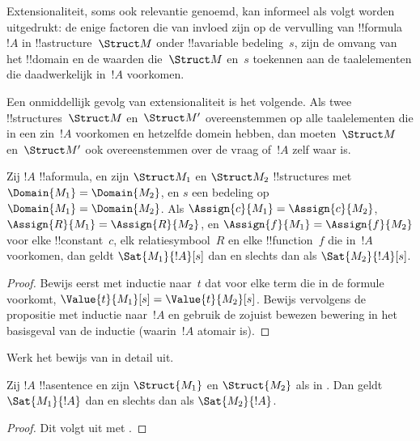 \documentclass[openany]{memoir}
\begin{document}
\begin{explain}
Extensionaliteit, soms ook relevantie genoemd, kan informeel als
volgt worden uitgedrukt: de enige factoren die van invloed zijn op de
vervulling van !!{formula}~$!A$ in !!a{structure}~$\Struct M$ onder
!!a{variable} bedeling~$s$, zijn de omvang van het !!{domain} en de
waarden die~$\Struct M$ en~$s$ toekennen aan de taalelementen die
daadwerkelijk in~$!A$ voorkomen.

Een onmiddellijk gevolg van extensionaliteit is het volgende. Als twee
!!{structure}s~$\Struct M$ en~$\Struct M'$ overeenstemmen op alle
taalelementen die in een zin~$!A$ voorkomen en hetzelfde domein hebben,
dan moeten~$\Struct M$ en~$\Struct M'$ ook overeenstemmen over de vraag
of~$!A$ zelf waar is.
\end{explain}

\begin{prop}[Extensionaliteit]
  Zij $!A$ !!a{formula}, en zijn $\Struct M_1$ en $\Struct M_2$
  !!{structure}s met $\Domain{M_1} = \Domain{M_2}$, en $s$ een
  bedeling op $\Domain{M_1} = \Domain{M_2}$. Als
  $\Assign{c}{M_1} = \Assign{c}{M_2}$, $\Assign{R}{M_1}=\Assign{R}{M_2}$,
  en $\Assign{f}{M_1} = \Assign{f}{M_2}$ voor elke !!{constant}~$c$,
  elk relatiesymbool~$R$ en elke !!{function}~$f$ die in~$!A$
  voorkomen, dan geldt $\Sat{M_1}{!A}[s]$ dan en slechts dan als
  $\Sat{M_2}{!A}[s]$.
\end{prop}

\begin{proof}
  Bewijs eerst met inductie naar~$t$ dat voor elke term die in de
  formule voorkomt, $\Value{t}{M_1}[s] = \Value{t}{M_2}[s]$. Bewijs vervolgens
  de propositie met inductie naar~$!A$ en gebruik de zojuist bewezen
  bewering in het basisgeval van de inductie (waarin~$!A$ atomair is).
\end{proof}

\begin{prob}
Werk het bewijs van 
in detail uit.
\end{prob}

\begin{cor}
  Zij $!A$ !!a{sentence} en zijn $\Struct{M_1}$ en $\Struct{M_2}$ als in
  . Dan geldt $\Sat{M_1}{!A}$ dan en slechts
  dan als $\Sat{M_2}{!A}$.
\end{cor}

\begin{proof}
Dit volgt uit  met
.
\end{proof}
\end{document}
